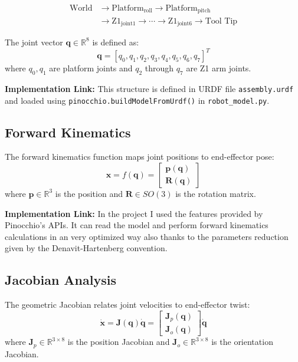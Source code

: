 \documentclass[journal,10pt,twocolumn]{IEEEtran}
\begin{document}
\begin{equation}
	\begin{aligned}
		\text{World} &\rightarrow \text{Platform}_{\text{roll}} \rightarrow \text{Platform}_{\text{pitch}} \\
		&\rightarrow \text{Z1}_{\text{joint1}} \rightarrow \cdots \rightarrow \text{Z1}_{\text{joint6}} \rightarrow \text{Tool Tip}
	\end{aligned}
\end{equation}

The joint vector $\mathbf{q} \in \mathbb{R}^8$ is defined as:
\begin{equation}
\mathbf{q} = [q_0, q_1, q_2, q_3, q_4, q_5, q_6, q_7]^T
\end{equation}
where $q_0, q_1$ are platform joints and $q_2$ through $q_7$ are Z1 arm joints.

\textbf{Implementation Link:} This structure is defined in URDF file \texttt{assembly.urdf} and loaded using \texttt{pinocchio.buildModelFromUrdf()} in \texttt{robot\_model.py}.

\subsection{Forward Kinematics}
The forward kinematics function maps joint positions to end-effector pose:
\begin{equation}
\mathbf{x} = f(\mathbf{q}) = \begin{bmatrix} \mathbf{p}(\mathbf{q}) \\ \mathbf{R}(\mathbf{q}) \end{bmatrix}
\end{equation}
where $\mathbf{p} \in \mathbb{R}^3$ is the position and $\mathbf{R} \in SO(3)$ is the rotation matrix.

\textbf{Implementation Link:} In the project I used the features provided by Pinocchio's APIs. It can read the model and perform forward kinematics calculations in an very optimized way also thanks to the parameters reduction given by the Denavit-Hartenberg convention.

\subsection{Jacobian Analysis}
The geometric Jacobian relates joint velocities to end-effector twist:
\begin{equation}
\dot{\mathbf{x}} = \mathbf{J}(\mathbf{q})\dot{\mathbf{q}} = \begin{bmatrix} \mathbf{J}_p(\mathbf{q}) \\ \mathbf{J}_o(\mathbf{q}) \end{bmatrix}\dot{\mathbf{q}}
\end{equation}
where $\mathbf{J}_p \in \mathbb{R}^{3 \times 8}$ is the position Jacobian and $\mathbf{J}_o \in \mathbb{R}^{3 \times 8}$ is the orientation Jacobian.
\end{document}
